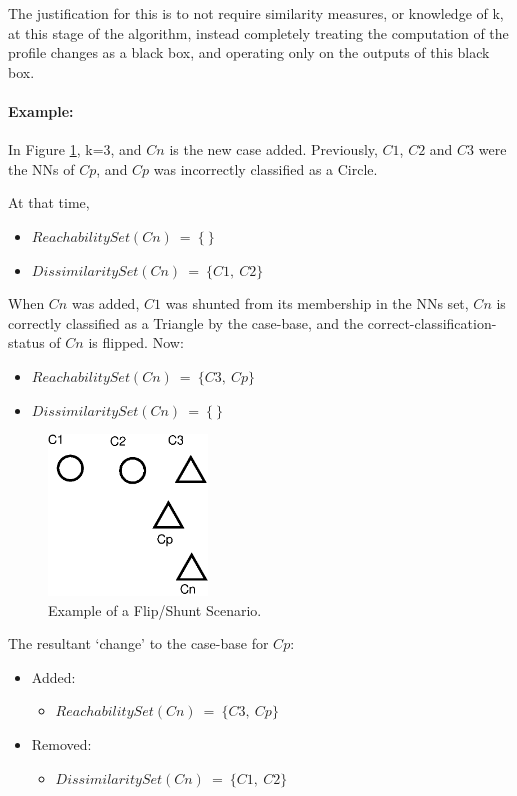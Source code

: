 \documentclass[a4paper,11pt]{report}
\begin{document}
The justification for this is to not require similarity measures, or knowledge of k, at this stage of the algorithm, instead completely treating the computation of the profile changes as a black box, and operating only on the outputs of this black box.

\paragraph{Example:} In Figure \ref{fig:flipprecedence}, k=3, and $Cn$ is the new case added. Previously, $C1$, $C2$ and $C3$ were the NNs of $Cp$, and $Cp$ was incorrectly classified as a Circle. 

At that time,
\begin{itemize}
	\item $ReachabilitySet(Cn)~=~\{~\}$
	\item $DissimilaritySet(Cn)~=~\{C1,~C2\}$
\end{itemize}

\begin{samepage}
When $Cn$ was added, $C1$ was shunted from its membership in the NNs set, $Cn$ is correctly classified as a Triangle by the case-base, and the correct-classification-status of $Cn$ is flipped. Now:
\begin{itemize}
	\item $ReachabilitySet(Cn)~=~\{C3,~Cp\}$
	\item $DissimilaritySet(Cn)~=~\{~\}$
\end{itemize}
\end{samepage}

\begin{figure}[h!] \centering
\includegraphics[width=120pt]{./Drawn/FlipPrecedence}
\caption{Example of a Flip/Shunt Scenario.}
\label{fig:flipprecedence}
\end{figure}

The resultant `change' to the case-base for $Cp$:
\begin{itemize}
	\item Added: 
	\begin{itemize}
		\item $ReachabilitySet(Cn)~=~\{C3,~Cp\}$
	\end{itemize}
	\item Removed:
	\begin{itemize}
		\item $DissimilaritySet(Cn)~=~\{C1,~C2\}$
	\end{itemize}
\end{itemize}
\end{document}

